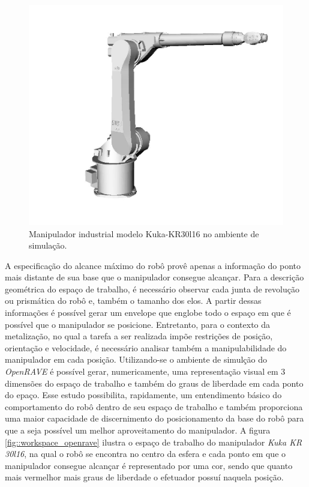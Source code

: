 \begin{figure}[h!]
\centering
	\includegraphics[width=0.8\columnwidth]{figs/openrave/kukakr30l16_openrave}
	\caption{Manipulador industrial modelo Kuka-KR30l16 no ambiente de simulação.}
	\label{fig::kukakr30l16_openrave}
\end{figure}

A especificação do alcance máximo do robô provê apenas a informação do ponto
mais distante de sua base que o manipulador consegue alcançar. Para a descrição
geométrica do espaço de trabalho, é necessário observar cada junta de revolução
ou prismática do robô e, também o tamanho dos elos. A partir dessas informações
é possível gerar um envelope que englobe todo o espaço em que é possível que o
manipulador se posicione. Entretanto, para o contexto da metalização, no qual a
tarefa a ser realizada impõe restrições de posição, orientação e velocidade, é
necessário analisar também a manipulabilidade do manipulador em cada posição.
Utilizando-se o ambiente de simulção do \textit{OpenRAVE} é possível gerar,
numericamente, uma representação visual em 3 dimensões do espaço de trabalho e
também do graus de liberdade em cada ponto do epaço. Esse estudo possibilita,
rapidamente, um entendimento básico do comportamento do robô dentro de seu
espaço de trabalho e também proporciona uma maior capacidade de discernimento do
posicionamento da base do robô para que a seja possível um melhor aproveitamento
do manipulador. A figura \ref{fig::workspace_openrave} ilustra o espaço de
trabalho do manipulador \textit{Kuka KR 30l16}, na qual o robô se
encontra no centro da esfera e cada ponto em que o manipulador consegue
alcançar é representado por uma cor, sendo que quanto mais vermelhor mais graus
de liberdade o efetuador possuí naquela posição.

